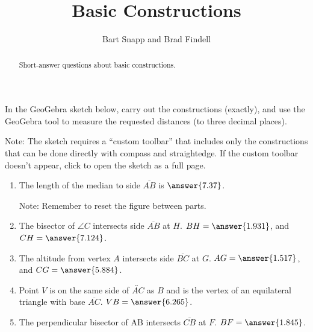 \documentclass[nooutcomes]{ximera}
\title{Basic Constructions}
\author{Bart Snapp and Brad Findell}
\begin{document}
\begin{abstract}
Short-answer questions about basic constructions. 
\end{abstract}
\maketitle

\begin{problem}
In the GeoGebra sketch below, carry out the constructions (exactly), and use the GeoGebra tool to measure the requested distances (to three decimal places).  

Note: The sketch requires a ``custom toolbar'' that includes only the constructions that can be done directly with compass and straightedge.  If the custom toolbar doesn't appear, click 
 to open the sketch as a full page.  

\begin{center}  
\end{center}
\begin{enumerate}
\item The length of the median to side $\overline{AB}$ 
is $\answer{7.37}$.  

Note: Remember to reset the figure between parts.   

\item The bisector of $\angle C$ intersects side $\overline{AB}$ at $H$.  
$BH =  \answer{1.931}$, and $CH = \answer{7.124}$.  

\item The altitude from vertex $A$ intersects side $\overline{BC}$ at $G$.
$AG = \answer{1.517}$, and 
$CG = \answer{5.884}$.  

\item Point $V$ is on the same side of $\overleftrightarrow{AC}$ as $B$ and is the vertex of an equilateral triangle with base $\overline{AC}$.  
$VB = \answer{6.265}$. 

\item The perpendicular bisector of AB intersects $\overline{CB}$ at $F$.  
$BF = \answer{1.845}$.
\end{enumerate}

\end{problem}
\end{document}
